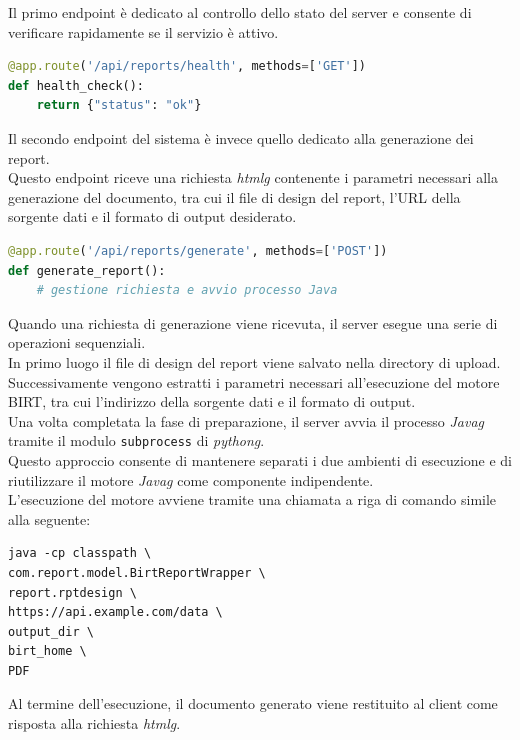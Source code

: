 Il primo endpoint è dedicato al controllo dello stato del server e consente di verificare rapidamente se il servizio è attivo.
\begin{lstlisting}[language=Python]
@app.route('/api/reports/health', methods=['GET'])
def health_check():
    return {"status": "ok"}
\end{lstlisting}

Il secondo endpoint del sistema è invece quello dedicato alla generazione dei report. \\
Questo endpoint riceve una richiesta \emph{\gls{htmlg}} contenente i parametri necessari alla generazione del documento, tra cui il file di design del report, l'URL della sorgente dati e il formato di output desiderato.
\begin{lstlisting}[language=Python]
@app.route('/api/reports/generate', methods=['POST'])
def generate_report():
    # gestione richiesta e avvio processo Java
\end{lstlisting}

Quando una richiesta di generazione viene ricevuta, il server esegue una serie di operazioni sequenziali. \\
In primo luogo il file di design del report viene salvato nella directory di upload. \\
Successivamente vengono estratti i parametri necessari all'esecuzione del motore BIRT, tra cui l'indirizzo della sorgente dati e il formato di output.\\
Una volta completata la fase di preparazione, il server avvia il processo \emph{\gls{Javag}} tramite il modulo \texttt{subprocess} di \emph{\gls{pythong}}. \\
Questo approccio consente di mantenere separati i due ambienti di esecuzione e di riutilizzare il motore \emph{\gls{Javag}} come componente indipendente.\\
L'esecuzione del motore avviene tramite una chiamata a riga di comando simile alla seguente:

\begin{lstlisting}
java -cp classpath \
com.report.model.BirtReportWrapper \
report.rptdesign \
https://api.example.com/data \
output_dir \
birt_home \
PDF
\end{lstlisting}

Al termine dell'esecuzione, il documento generato viene restituito al client come risposta alla richiesta \emph{\gls{htmlg}}.


